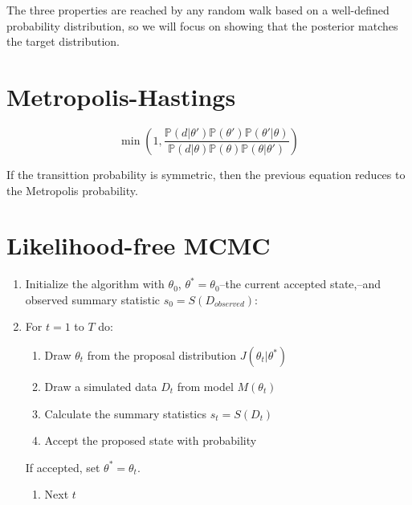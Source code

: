 \documentclass[]{book}
\providecommand{\tightlist}{%
  \setlength{\itemsep}{0pt}\setlength{\parskip}{0pt}}
\begin{document}
The three properties are reached by any random walk based on a well-defined
probability distribution, so we will focus on showing that the posterior matches
the target distribution.

\hypertarget{metropolis-hastings}{%
\section{Metropolis-Hastings}\label{metropolis-hastings}}

\[
\min\left(1, \frac{\mathbb{P}{\left(d|\theta'\right)}\mathbb{P}{\left(\theta'\right)}\mathbb{P}{\left(\theta'|\theta\right)}}{\mathbb{P}{\left(d|\theta\right)}\mathbb{P}{\left(\theta\right)}\mathbb{P}{\left(\theta|\theta'\right)}}\right)
\]

If the transittion probability is symmetric, then the previous equation reduces
to the Metropolis probability.

\hypertarget{likelihood-free-mcmc}{%
\section{Likelihood-free MCMC}\label{likelihood-free-mcmc}}

\begin{enumerate}
\def\labelenumi{\arabic{enumi}.}
\item
  Initialize the algorithm with \(\theta_0\), \(\theta^* =\theta_0\)--the current accepted
  state,--and observed summary statistic \(s_0 = S(D_{observed})\):
\item
  For \(t = 1\) to \(T\) do:

  \begin{enumerate}
  \def\labelenumii{\alph{enumii}.}
  \item
    Draw \(\theta_t\) from the proposal distribution \(J(\theta_t|\theta^*)\)
  \item
    Draw a simulated data \(D_t\) from model \(M(\theta_t)\)
  \item
    Calculate the summary statistics \(s_t = S(D_t)\)
  \item
    Accept the proposed state with probability
  \end{enumerate}

  If accepted, set \(\theta^* = \theta_t\).

  \begin{enumerate}
  \def\labelenumii{\alph{enumii}.}
  \setcounter{enumii}{4}
  \tightlist
  \item
    Next \(t\)
  \end{enumerate}
\end{enumerate}
\end{document}
